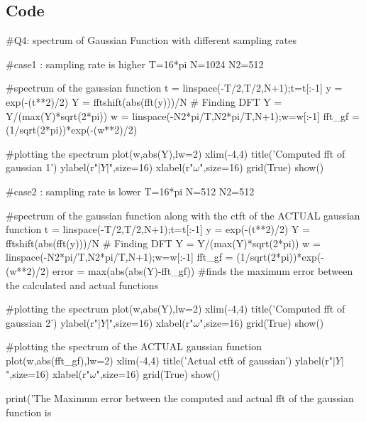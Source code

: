 \documentclass[11pt]{article}
\begin{document}
\subsection{Code}
\begin{python}
#Q4: spectrum of Gaussian Function with different sampling rates

#case1 : sampling rate is higher
T=16*pi
N=1024
N2=512

#spectrum of the gaussian function
t = linspace(-T/2,T/2,N+1);t=t[:-1]
y = exp(-(t**2)/2)
Y = fftshift(abs(fft(y)))/N # Finding DFT
Y = Y/(max(Y)*sqrt(2*pi))
w = linspace(-N2*pi/T,N2*pi/T,N+1);w=w[:-1]
fft_gf = (1/sqrt(2*pi))*exp(-(w**2)/2)

#plotting the spectrum
plot(w,abs(Y),lw=2)
xlim(-4,4)
title('Computed fft of gaussian 1')
ylabel(r"$|Y|$",size=16)
xlabel(r"$\omega$",size=16)
grid(True)
show()


#case2 : sampling rate is lower
T=16*pi
N=512
N2=512

#spectrum of the gaussian function along with the ctft of the ACTUAL gaussian function
t = linspace(-T/2,T/2,N+1);t=t[:-1]
y = exp(-(t**2)/2)
Y = fftshift(abs(fft(y)))/N # Finding DFT
Y = Y/(max(Y)*sqrt(2*pi))
w = linspace(-N2*pi/T,N2*pi/T,N+1);w=w[:-1]
fft_gf = (1/sqrt(2*pi))*exp(-(w**2)/2)
error = max(abs(abs(Y)-fft_gf)) #finds the maximum error between the calculated and actual functions

#plotting the spectrum
plot(w,abs(Y),lw=2)
xlim(-4,4)
title('Computed fft of gaussian 2')
ylabel(r"$|Y|$",size=16)
xlabel(r"$\omega$",size=16)
grid(True)
show()

#plotting the spectrum of the ACTUAL gaussian function
plot(w,abs(fft_gf),lw=2)
xlim(-4,4)
title('Actual ctft of gaussian')
ylabel(r"$|Y|$",size=16)
xlabel(r"$\omega$",size=16)
grid(True)
show()

print('The Maximum error between the computed and actual fft of the gaussian function is %
\end{python}
\end{document}
